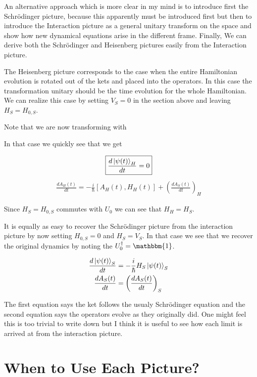 \documentclass[12pt]{article}
\begin{document}
An alternative approach which is more clear in my mind is to introduce first the Schr{\"o}dinger picture, because this apparently must be introduced first but then to introduce the Interaction picture as a general unitary transform on the space and show how new dynamical equations arise in the different frame. Finally, We can derive both the Schr{\"o}dinger and Heisenberg pictures easily from the Interaction picture.

The Heisenberg picture corresponds to the case when the entire Hamiltonian evolution is rotated out of the kets and placed into the operators. In this case the transformation unitary should be the time evolution for the whole Hamiltonian. We can realize this case by setting $V_S = 0$ in the section above and leaving $H_S = H_{0,S}$. 

Note that we are now transforming with


In that case we quickly see that we get

\begin{align}
\boxed{\frac{d \ket{\psi(t)}_H}{d t} = 0}
\end{align}
\begin{align}
\boxed{\frac{d A_H(t)}{d t} = -\frac{i}{\hbar} \left[A_H(t), H_H(t)\right] + \left(\frac{d A_S(t)}{d t} \right)_H}
\end{align}

Since $H_S = H_{0,S}$ commutes with $U_0$ we can see that $H_H = H_S$.

It is equally as easy to recover the Schr{\"o}dinger picture from the interaction picture by now setting $H_{0,S} = 0$ and $H_S=V_S$. In that case we see that we recover the original dynamics by noting the $U_0^{\dag} = \mathbbm{1}$.

\begin{align}
\frac{d \ket{\psi(t)}_S}{d t} &= -\frac{i}{\hbar} H_S \ket{\psi(t)}_S\\
\frac{d A_S(t)}{d t} &= \left(\frac{d A_S(t)}{d t} \right)_S
\end{align}

The first equation says the ket follows the usualy Schr{\"o}dinger equation and the second equation says the operators evolve as they originally did. One might feel this is too trivial to write down but I think it is useful to see how each limit is arrived at from the interaction picture.

\section{When to Use Each Picture?}
\end{document}

